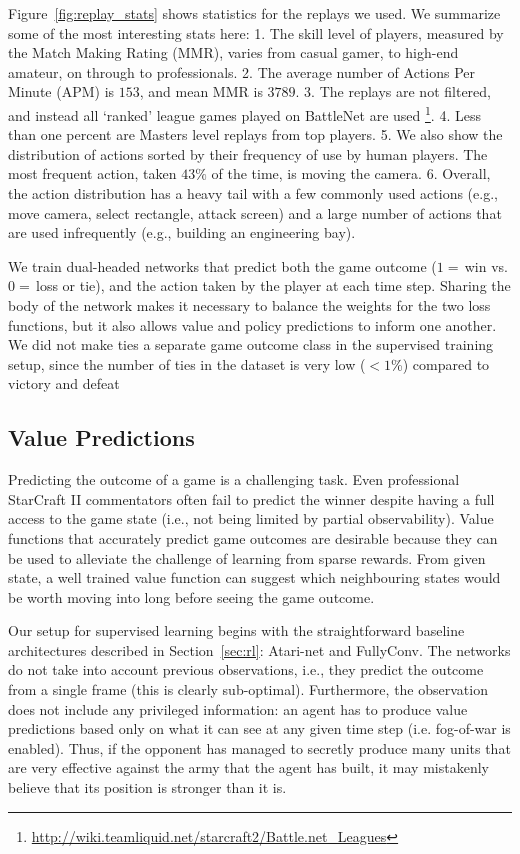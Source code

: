 Figure~\ref{fig:replay_stats} shows statistics for the replays we used. We summarize some of the most interesting stats here: 1. The skill level of players, measured by the Match Making Rating (MMR), varies from casual gamer, to high-end amateur, on through to professionals. 2. The average number of Actions Per Minute (APM) is $153$, and mean MMR is $3789$.  3. The replays are not filtered, and instead all `ranked' league games played on BattleNet are used \footnote{\url{http://wiki.teamliquid.net/starcraft2/Battle.net\_Leagues}}.
4. Less than one percent are Masters level replays from top players. 5. We also show the distribution of actions sorted by their frequency of use by human players. The most frequent action, taken $43\%$ of the time, is moving the camera. 6. Overall, the action distribution has a heavy tail with a few commonly used actions (e.g., move camera, select rectangle,  attack screen) and a large number of actions that are used infrequently (e.g., building an engineering bay).

We train dual-headed networks that predict both the game outcome ($1=\,$win vs. $0=\,$loss or tie), and the action taken by the player at each time step. Sharing the body of the network makes it necessary to balance the weights for the two loss functions, but it also allows value and policy predictions to inform one another. We did not make ties a separate game outcome class in the supervised training setup, since the number of ties in the dataset is very low ($< 1$\%) compared to victory and defeat

\subsection{Value Predictions}

Predicting the outcome of a game is a challenging task. Even professional StarCraft II commentators often fail to predict the winner despite having a full access to the game state (i.e., not being limited by partial observability). Value functions that accurately predict game outcomes are desirable because they can be used to alleviate the challenge of learning from sparse rewards. From given state, a well trained value function can suggest which neighbouring states would be worth moving into long before seeing the game outcome.

Our setup for supervised learning begins with the straightforward baseline architectures described in Section~\ref{sec:rl}: Atari-net and FullyConv. The networks do not take into account previous observations, i.e., they predict the outcome from a single frame (this is clearly sub-optimal). Furthermore, the observation does not include any privileged information: an agent has to produce value predictions based only on what it can see at any given time step (i.e. fog-of-war is enabled).  Thus, if the opponent has managed to secretly produce many units that are very effective against the army that the agent has built, it may mistakenly believe that its position is stronger than it is.

